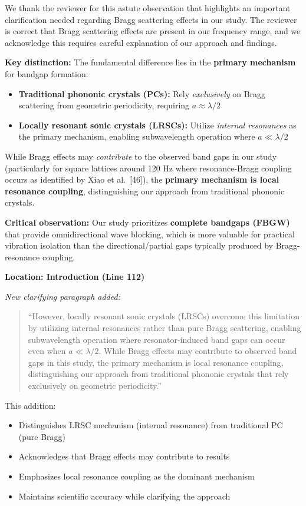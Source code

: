 \documentclass[11pt,a4paper]{article}
\newenvironment{responsebox}{%
    \par\medskip\noindent{\color{responsecolor}\rule{\linewidth}{2pt}}\par
    \noindent{\color{responsecolor}\bfseries Response}\par\smallskip
}{%
    \par\noindent{\color{responsecolor}\rule{\linewidth}{0.5pt}}\medskip
}
\newenvironment{changesbox}{%
    \par\medskip\noindent{\color{changescolor}\rule{\linewidth}{2pt}}\par
    \noindent{\color{changescolor}\bfseries Manuscript Changes}\par\smallskip
}{%
    \par\noindent{\color{changescolor}\rule{\linewidth}{0.5pt}}\medskip
}
\begin{document}
\begin{responsebox}
We thank the reviewer for this astute observation that highlights an important clarification needed regarding Bragg scattering effects in our study. The reviewer is correct that Bragg scattering effects are present in our frequency range, and we acknowledge this requires careful explanation of our approach and findings.

\textbf{Key distinction:} The fundamental difference lies in the \textbf{primary mechanism} for bandgap formation:
\begin{itemize}
    \item \textbf{Traditional phononic crystals (PCs):} Rely \textit{exclusively} on Bragg scattering from geometric periodicity, requiring $a \approx \lambda/2$
    \item \textbf{Locally resonant sonic crystals (LRSCs):} Utilize \textit{internal resonances} as the primary mechanism, enabling subwavelength operation where $a \ll \lambda/2$
\end{itemize}

While Bragg effects may \textit{contribute} to the observed band gaps in our study (particularly for square lattices around 120 Hz where resonance-Bragg coupling occurs as identified by Xiao et al.~[46]), the \textbf{primary mechanism is local resonance coupling}, distinguishing our approach from traditional phononic crystals.

\textbf{Critical observation:} Our study prioritizes \textbf{complete bandgaps (FBGW)} that provide omnidirectional wave blocking, which is more valuable for practical vibration isolation than the directional/partial gaps typically produced by Bragg-resonance coupling.
\end{responsebox}

\begin{changesbox}
\textbf{Location: Introduction (Line 112)}

\textit{New clarifying paragraph added:}
\begin{quote}
\textcolor{redtext}{``However, locally resonant sonic crystals (LRSCs) overcome this limitation by utilizing internal resonances rather than pure Bragg scattering, enabling subwavelength operation where resonator-induced band gaps can occur even when $a \ll \lambda/2$. While Bragg effects may contribute to observed band gaps in this study, the primary mechanism is local resonance coupling, distinguishing our approach from traditional phononic crystals that rely exclusively on geometric periodicity.''}
\end{quote}

This addition:
\begin{itemize}
    \item Distinguishes LRSC mechanism (internal resonance) from traditional PC (pure Bragg)
    \item Acknowledges that Bragg effects may contribute to results
    \item Emphasizes local resonance coupling as the dominant mechanism
    \item Maintains scientific accuracy while clarifying the approach
\end{itemize}
\end{changesbox}
\end{document}
